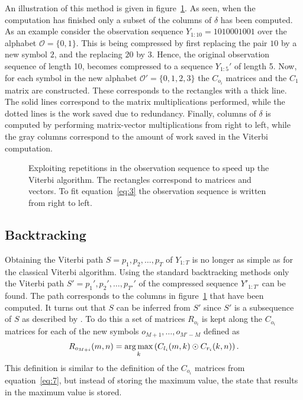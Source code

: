 An illustration of this method is given in
figure~\ref{fig:exploiting-repetitions}. As seen, when the computation has
finished only a subset of the columns of $\delta$ has been computed. As an
example consider the observation sequence $Y_{1:10} = 1010001001$ over the
alphabet $\mathcal{O} = \{0, 1\}$. This is being compressed by first replacing
the pair $10$ by a new symbol $2$, and the replacing $20$ by $3$. Hence, the
original observation sequence of length 10, becomes compressed to a sequence
$Y_{1:5}'$ of length 5. Now, for each symbol in the new alphabet
$\mathcal{O'} = \{0, 1, 2, 3\}$ the $C_{o_i}$ matrices and the $C_1$ matrix are
constructed. These corresponds to the rectangles with a thick line. The solid
lines correspond to the matrix multiplications performed, while the dotted
lines is the work saved due to redundancy. Finally, columns of $\delta$ is
computed by performing matrix-vector multiplications from right to left, while
the gray columns correspond to the amount of work saved in the Viterbi
computation.

\begin{figure}
  \centering
  
  \caption{Exploiting repetitions in the observation sequence to speed up the
    Viterbi algorithm. The rectangles correspond to matrices and vectors. To
    fit equation~\eqref{eq:3} the observation sequence is written from right to
    left.}
  \label{fig:exploiting-repetitions}
\end{figure}

\subsection{Backtracking}
\label{sec:backtracking}

Obtaining the Viterbi path $S = p_1, p_2, \dots, p_T$ of $Y_{1:T}$ is no longer
as simple as for the classical Viterbi algorithm. Using the standard
backtracking methods only the Viterbi path $S' = p_1', p_2', \dots, p_{T'}'$
of the compressed sequence $Y'_{1:T'}$ can be found. The path corresponds to
the columns in figure~\ref{fig:exploiting-repetitions} that have been
computed. It turns out that $S$ can be inferred from $S'$ since $S'$
is a subsequence of $S$ as described by \citet{lifshits2009speeding}. To do
this a set of matrices $R_{o_i}$ is kept along the $C_{o_i}$ matrices for each
of the new symbols $o_{M + 1}, \dots, o_{M' - M}$ defined as
\begin{equation*}
  R_{o_{M + i}}(m, n) = \operatorname*{arg\,max}_k
  \left(
    C_{l_i}(m, k) \odot C_{r_i}(k, n)
  \right).
\end{equation*}
This definition is similar to the definition of the $C_{o_i}$ matrices from
equation~\eqref{eq:7}, but instead of storing the maximum value, the state that
results in the maximum value is stored.

